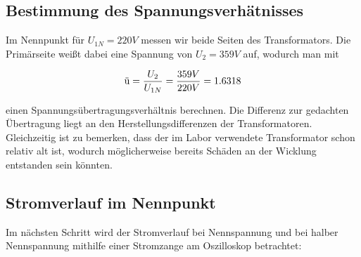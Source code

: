 \documentclass{article}
\begin{document}
\subsection{Bestimmung des Spannungsverhätnisses}
\label{sec:best-des-spann}

Im Nennpunkt für $U_{1N} = 220V$ messen wir beide Seiten des Transformators. Die Primärseite weißt dabei eine Spannung von $U_{2} = 359V$ auf, wodurch man mit

\begin{equation*}
  \textnormal{ü} = \frac{U_{2}}{U_{1N}} = \frac{359V}{220V} = 1.6318
\end{equation*}

einen Spannungsübertragungsverhältnis berechnen. Die Differenz zur gedachten Übertragung liegt an den Herstellungsdifferenzen der Transformatoren. Gleichzeitig ist zu bemerken, dass der im Labor verwendete Transformator schon relativ alt ist, wodurch möglicherweise bereits Schäden an der Wicklung entstanden sein könnten.


\subsection{Stromverlauf im Nennpunkt}
\label{sec:stromv-im-nennp}

Im nächsten Schritt wird der Stromverlauf bei Nennspannung und bei halber Nennspannung mithilfe einer Stromzange am Oszilloskop betrachtet:
\end{document}
